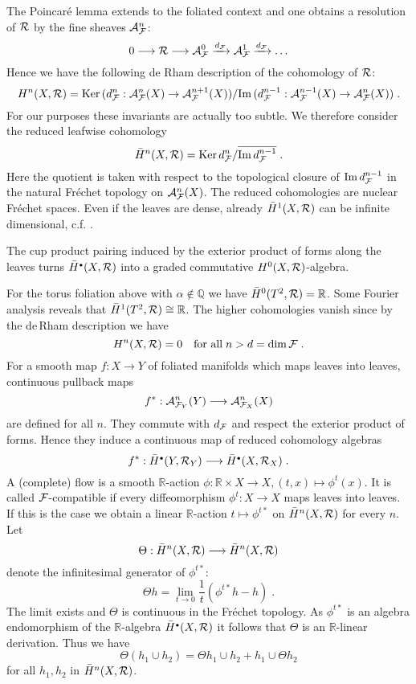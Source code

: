 \documentclass[11pt,leqno]{article}
\newcommand{\Q}{{\mathbb{Q}}}
\newcommand{\R}{{\mathbb{R}}}
\newcommand{\Imm}{\mathrm{Im}\,}
\newcommand{\Ker}{\mathrm{Ker}\,}
\newcommand{\Ah}{{\cal A}}
\newcommand{\Fh}{{\cal F}}
\newcommand{\Rh}{{\cal R}}
\newcommand{\oH}{\bar{H}}
\newcommand{\hullet}{{\scriptscriptstyle \bullet}}
\begin{document}
The Poincar\'e lemma extends to the foliated context and one obtains a resolution of $\Rh$ by the fine sheaves $\Ah^n_{\Fh}$:
\[
0 \longrightarrow \Rh \longrightarrow \Ah^0_{\Fh} \xrightarrow{d_{\Fh}} \Ah^1_{\Fh} \xrightarrow{d_{\Fh}} \ldots
\]
Hence we have the following de Rham description of the cohomology of $\Rh$:
\[
H^n (X, \Rh) = \Ker (d^n_{\Fh} : \Ah^n_{\Fh} (X) \to \Ah^{n+1}_{\Fh} (X)) / \Imm (d^{n-1}_{\Fh} : \Ah^{n-1}_{\Fh} (X) \to \Ah^n_{\Fh} (X)) \; .
\]
For our purposes these invariants are actually too subtle. We therefore consider the reduced leafwise cohomology
\[
\oH^n (X , \Rh) = \Ker d^n_{\Fh} / \overline{\Imm d^{n-1}_{\Fh}} \; .
\]
Here the quotient is taken with respect to the topological closure of $\Imm d^{n-1}_{\Fh}$ in the natural Fr\'echet topology on $\Ah^n_{\Fh} (X)$. The reduced cohomologies are nuclear Fr\'echet spaces. Even if the leaves are dense, already $\oH^1 (X,\Rh)$ can be infinite dimensional, c.f. \cite{DS1}.

The cup product pairing induced by the exterior product of forms along the leaves turns $\oH^{\hullet} (X,\Rh)$ into a graded commutative $H^0 (X,\Rh)$-algebra.

For the torus foliation above with $\alpha \notin \Q$ we have $\oH^0 (T^2 , \Rh) = \R$. Some Fourier analysis reveals that $\oH^1 (T^2 , \Rh) \cong \R$. The higher cohomologies vanish since by the de\,Rham description we have
\[
H^n (X, \Rh) = 0 \quad \mbox{for all} \; n > d = \dim \Fh \; .
\]
For a smooth map $f : X \to Y$ of foliated manifolds which maps leaves into leaves, continuous pullback maps
\[
f^* : \Ah^n_{\Fh_Y} (Y) \longrightarrow \Ah^n_{\Fh_X} (X)
\]
are defined for all $n$. They commute with $d_{\Fh}$ and respect the exterior product of forms. Hence they induce a continuous map of reduced cohomology algebras
\[
f^* : \oH^{\hullet} (Y , \Rh_Y) \longrightarrow \oH^{\hullet} (X , \Rh_X) \; .
\]
A (complete) flow is a smooth $\R$-action $\phi : \R \times X \to X , (t,x) \mapsto \phi^t (x)$. It is called $\Fh$-compatible if every diffeomorphism $\phi^t : X \to X$ maps leaves into leaves. If this is the case we obtain a linear $\R$-action $t \mapsto \phi^{t*}$ on $\oH^n (X , \Rh)$ for every $n$. Let
\[
\Theta : \oH^n (X, \Rh) \longrightarrow \oH^n (X,\Rh)
\]
denote the infinitesimal generator of $\phi^{t*}$:
\[
\Theta h = \lim_{t\to 0} \frac{1}{t} (\phi^{t*} h -h ) \; .
\]
The limit exists and $\Theta$ is continuous in the Fr\'echet topology. As $\phi^{t*}$ is an algebra endomorphism of the $\R$-algebra $\oH^{\hullet} (X,\Rh)$ it follows that $\Theta$ is an $\R$-linear derivation. Thus we have
\begin{equation}
  \label{eq:10}
  \Theta (h_1 \cup h_2) = \Theta h_1 \cup h_2 + h_1 \cup \Theta h_2
\end{equation}
for all $h_1 , h_2$ in $\oH^n (X,\Rh)$.
\end{document}
